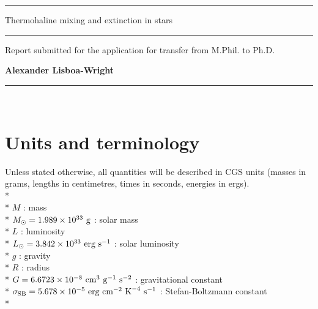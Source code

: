 \documentclass[12pt, a4paper]{report}
\begin{document}
\begin{titlepage}

\vspace*{-0.4cm}

\begin{center}
\hrule
\vspace*{0.5cm}
{\Huge \sc Thermohaline mixing and extinction in stars \par}
\vspace*{0.5cm}
\hrule

\vspace*{5mm}
{\normalsize Report submitted for the application for transfer from M.Phil. to Ph.D.}

\vfill

{\bf Alexander Lisboa-Wright}

\end{center}

\vspace*{1.0cm}

\hrule
\vspace*{0.2cm}
\\

\end{titlepage}

\begin{abstract}
\end{abstract}

\chapter{Units and terminology}
Unless stated otherwise, all quantities will be described in CGS units (masses in grams, lengths in centimetres, times in seconds, energies in ergs). \\*
\\*
$M$ : mass\\*
$M_{\odot} = 1.989 \times 10^{33} \textnormal{ g}$ : solar mass\\*
$L$ : luminosity\\*
$L_{\odot} = 3.842 \times 10^{33} \textnormal{ erg s}^{-1}$ : solar luminosity\\*
$g$ : gravity\\*
$R$ : radius\\*
$G = 6.6723 \times 10^{-8} \textnormal{ cm}^{3} \textnormal{ g}^{-1} \textnormal{ s}^{-2}$ : gravitational constant\\*
$\sigma_{\textnormal{SB}} = 5.678 \times 10^{-5} \textnormal{ erg cm}^{-2} \textnormal{ K}^{-4} \textnormal{ s}^{-1}$ : Stefan-Boltzmann constant\\*
\end{document}
